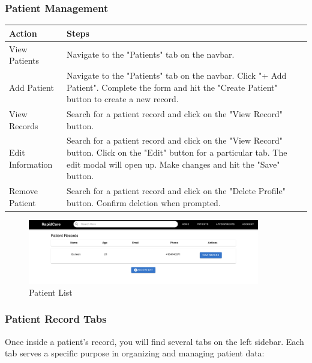 \documentclass[12pt, titlepage]{article}
\begin{document}
\subsubsection{Patient Management}
\begin{longtable}{p{}p{}}
\toprule
\textbf{Action} & \textbf{Steps} \\
\midrule
View Patients & Navigate to the "Patients" tab on the navbar. \\
\midrule
Add Patient & Navigate to the "Patients" tab on the navbar. \newline Click "+ Add Patient". \newline Complete the form and hit the "Create Patient" button to create a new record. \\
\midrule
View Records & Search for a patient record and click on the "View Record" button. \\
\midrule
Edit Information & Search for a patient record and click on the "View Record" button. \newline Click on the "Edit" button for a particular tab. \newline The edit modal will open up. \newline Make changes and hit the "Save" button. \\
\midrule
Remove Patient & Search for a patient record and click on the "Delete Profile" button. \newline Confirm deletion when prompted. \\
\bottomrule
\end{longtable}

\begin{figure}[H]
\centering
\includegraphics[width=0.9\textwidth]{patient_list.png}
\caption{Patient List}
\label{fig:Patient List}
\end{figure}

\subsubsection{Patient Record Tabs}
Once inside a patient's record, you will find several tabs on the left sidebar. Each tab serves a specific purpose in organizing and managing patient data:
\end{document}
